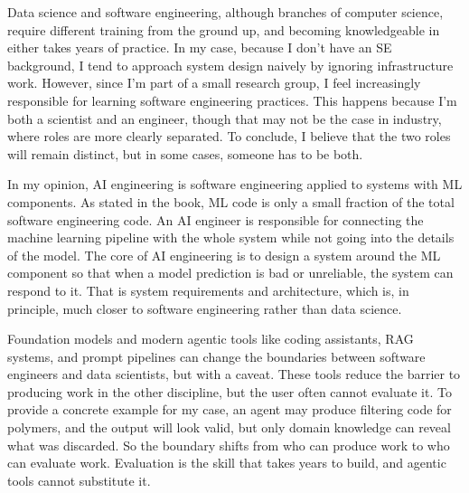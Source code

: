 \documentclass[11pt,a4paper]{article}
\begin{document}

Data science and software engineering, although branches of computer science, require different training from the ground up, and becoming knowledgeable in either takes years of practice. In my case, because I don't have an SE background, I tend to approach system design naively by ignoring infrastructure work. However, since I'm part of a small research group, I feel increasingly responsible for learning software engineering practices. This happens because I'm both a scientist and an engineer, though that may not be the case in industry, where roles are more clearly separated. To conclude, I believe that the two roles will remain distinct, but in some cases, someone has to be both.


In my opinion, AI engineering is software engineering applied to systems with ML components. As stated in the book, ML code is only a small fraction of the total software engineering code. An AI engineer is responsible for connecting the machine learning pipeline with the whole system while not going into the details of the model. The core of AI engineering is to design a system around the ML component so that when a model prediction is bad or unreliable, the system can respond to it. That is system requirements and architecture, which is, in principle, much closer to software engineering rather than data science.



Foundation models and modern agentic tools like coding assistants, RAG systems, and prompt pipelines can change the boundaries between software engineers and data scientists, but with a caveat. These tools reduce the barrier to producing work in the other discipline, but the user often cannot evaluate it. To provide a concrete example for my case, an agent may produce filtering code for polymers, and the output will look valid, but only domain knowledge can reveal what was discarded. So the boundary shifts from who can produce work to who can evaluate work. Evaluation is the skill that takes years to build, and agentic tools cannot substitute it. 
\end{document}
